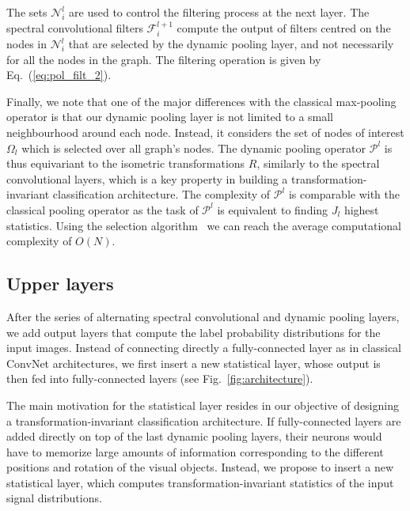 \documentclass[10pt,journal,compsoc]{IEEEtran}
\newcommand{\renata}[1]{\textcolor{black}{#1}}
\begin{document}
	The sets $\mathcal{N}_i^{l}$ are used to control the filtering process at the next layer. The spectral convolutional filters $\mathcal{F}_i^{l+1}$ compute the output of filters centred on the nodes in $\mathcal{N}_i^{l}$ that are selected by the dynamic pooling layer, and not necessarily for all the nodes in the graph. The filtering operation is given by Eq.~(\ref{eq:pol_filt_2}).
	
	
	Finally, we note that one of the major differences with the classical max-pooling operator is that our dynamic pooling layer is not limited to a small neighbourhood around each node. Instead, it considers the set of nodes of interest $\Omega_l$ which is selected over all graph's nodes. The dynamic pooling operator $\mathcal{P}^{l}$ is thus equivariant to the isometric transformations $R$, similarly to the spectral convolutional layers, which is a key property in building a transformation-invariant classification architecture. The complexity of  $\mathcal{P}^l$ is comparable with the classical pooling operator as the task of $\mathcal{P}^l$ is equivalent to finding $J_l$ highest statistics. Using the selection algorithm~\cite{bb:Knuth98} we can reach the average computational complexity of $O(N)$.
	
	\subsection{Upper layers}
	\label{s:hist}
	
	After the series of alternating spectral convolutional and dynamic pooling layers, we add output layers that compute the label probability distributions for the input images. Instead of connecting directly a fully-connected layer as in classical ConvNet architectures, we first insert a new statistical layer, whose output is then fed into fully-connected layers (see Fig.~\ref{fig:architecture}). 
	
	The main motivation for the statistical layer resides in our objective of designing a transformation-invariant classification architecture. If fully-connected layers are added directly on top of the last dynamic pooling layers, their neurons would have to memorize large amounts of information corresponding to the different positions and rotation of the visual objects. Instead, we propose to insert a new statistical layer, which computes transformation-invariant statistics of the input signal distributions.
	
\end{document}
